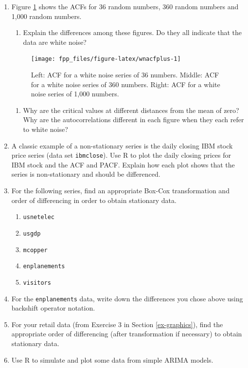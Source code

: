 \documentclass[]{book}
\providecommand{\tightlist}{%
  \setlength{\itemsep}{0pt}\setlength{\parskip}{0pt}}
\begin{document}
\begin{enumerate}
\def\labelenumi{\arabic{enumi}.}
\item
  Figure \ref{fig:wnacfplus} shows the ACFs for 36 random numbers, 360 random numbers and 1,000 random numbers.

  \begin{enumerate}
  \def\labelenumii{(\alph{enumii})}
  \tightlist
  \item
    Explain the differences among these figures. Do they all indicate that the data are white noise?
  \end{enumerate}

  \begin{figure}

   {\centering \texttt{[image: fpp\_files/figure-latex/wnacfplus-1]} 

   }

   \caption{Left: ACF for a white noise series of 36 numbers. Middle: ACF for a white noise series of 360 numbers. Right: ACF for a white noise series of 1,000 numbers.}\label{fig:wnacfplus}
   \end{figure}

  \begin{enumerate}
  \def\labelenumii{(\alph{enumii})}
  \setcounter{enumii}{1}
  \tightlist
  \item
    Why are the critical values at different distances from the mean of zero? Why are the autocorrelations different in each figure when they each refer to white noise?
  \end{enumerate}
\item
  A classic example of a non-stationary series is the daily closing IBM stock price series (data set \texttt{ibmclose}). Use R to plot the daily closing prices for IBM stock and the ACF and PACF. Explain how each plot shows that the series is non-stationary and should be differenced.
\item
  For the following series, find an appropriate Box-Cox transformation and order of differencing in order to obtain stationary data.

  \begin{enumerate}
  \def\labelenumii{(\alph{enumii})}
  \tightlist
  \item
    \texttt{usnetelec}
  \item
    \texttt{usgdp}
  \item
    \texttt{mcopper}
  \item
    \texttt{enplanements}
  \item
    \texttt{visitors}
  \end{enumerate}
\item
  For the \texttt{enplanements} data, write down the differences you chose above using backshift operator notation.
\item
  For your retail data (from Exercise 3 in Section \ref{ex-graphics}), find the appropriate order of differencing (after transformation if necessary) to obtain stationary data.
\item
  Use R to simulate and plot some data from simple ARIMA models.


\end{enumerate}
\end{document}
